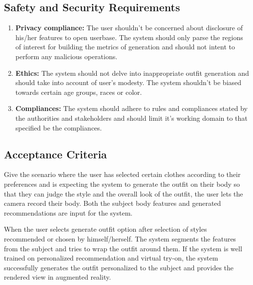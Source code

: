 	\subsection{Safety and Security Requirements}
		\begin{enumerate}
			\item \textbf{Privacy compliance:} The user shouldn't be concerned about disclosure of his/her features to open userbase. The system should only parse the regions of interest for building the metrics of generation and should not intent to perform any malicious operations.
			\item \textbf{Ethics:} The system should not delve into inappropriate outfit generation and should take into account of user's modesty. The system shouldn't be biased towards certain age groups, races or color.
			\item \textbf{Compliances:} The system should adhere to rules and compliances stated by the authorities and stakeholders and should limit it's working domain to that specified be the compliances.
		\end{enumerate}
	
	\subsection{Acceptance Criteria}
		Give the scenario where the user has selected certain clothes according to their preferences and is expecting the system to generate the outfit on their body so that they can judge the style and the overall look of the outfit, the user lets the camera record their body. Both the subject body features and generated recommendations are input for the system.

		When the user selects generate outfit option after selection of styles recommended or chosen by himself/herself. The system segments the features from the subject and tries to wrap the outfit around them. If the system is well trained on personalized recommendation and virtual try-on, the system successfully generates the outfit personalized to the subject and provides the rendered view in augmented reality.

